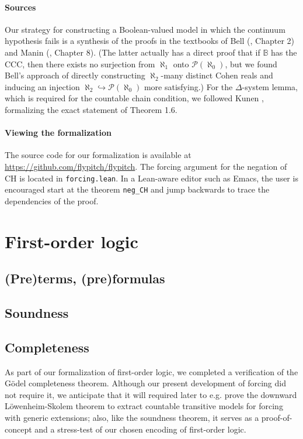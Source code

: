 \documentclass[a4paper,USenglish,cleveref, autoref]{lipics-v2019}
\newcommand{\B}{\mathbb{B}}
\begin{document}
\paragraph*{Sources}
Our strategy for constructing a Boolean-valued model in which the continuum hypothesis fails is a synthesis of the proofs in the textbooks of Bell (\cite{bell1}, Chapter 2) and Manin (\cite{manin1}, Chapter 8). (The latter actually has a direct proof that if $\B$ has the CCC, then there exists no surjection from $\aleph_1$ onto $\mathcal{P}(\aleph_0)$, but we found Bell's approach of directly constructing $\aleph_2$-many distinct Cohen reals and inducing an injection $\aleph_2 \hookrightarrow \mathcal{P}(\aleph_0)$ more satisfying.) For the $\Delta$-system lemma, which is required for the countable chain condition, we followed Kunen \cite{kunen1}, formalizing the exact statement of Theorem 1.6.

\paragraph*{Viewing the formalization}
The source code for our formalization is available at \url{https://github.com/flypitch/flypitch}. The forcing argument for the negation of CH is located in \lstinline{forcing.lean}. In a Lean-aware editor such as Emacs, the user is encouraged start at the theorem \lstinline{neg_CH} and jump backwards to trace the dependencies of the proof.
\section{First-order logic}
\label{sect:fol}

\subsection{(Pre)terms, (pre)formulas}

\subsection{Soundness}

\subsection{Completeness}
As part of our formalization of first-order logic, we completed a verification of the G\"odel completeness theorem. Although our present development of forcing did not require it, we anticipate that it will required later to e.g. prove the downward L\"owenheim-Skolem theorem to extract countable transitive models for forcing with generic extensions; also, like the soundness theorem, it serves as a proof-of-concept and a stress-test of our chosen encoding of first-order logic.
\end{document}

